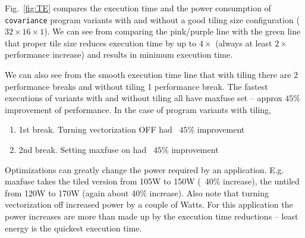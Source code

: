 Fig.~\ref{fig:TE} compares the execution time and the power consumption of 
\texttt{covariance} program variants with and without a good tiling size
configuration ($32\times16\times1$).
We can see from comparing the pink/purple line with the green line that 
proper tile size reduces execution time by up to $4\times$ (always 
at least $2\times$ performance increase) and results in
minimum execution time.  

We can also see from the smooth execution time line that 
with tiling there are 2 performance breaks and without tiling 1 performance break.
The fastest executions of variants with and without tiling all have maxfuse set -- approx $45\%$ improvement
of performance.
In the case of program variants with tiling, 
\begin{enumerate}
\item 1st break. Turning vectorization OFF had ~$45\%$ improvement 
\item 2nd break. Setting maxfuse on had ~$45\%$  improvement
\end{enumerate}

Optimizations can greatly change the power required by an application. 
E.g. maxfuse takes the tiled version from 105W to 150W (~40\% increase), the untiled
from 120W to 170W (again about 40\% increase). Also note that turning vectorization 
off increased power by a couple of Watts.
For this application the power increases are more than made up by the execution
time reductions -- least energy is the quickest execution time.



